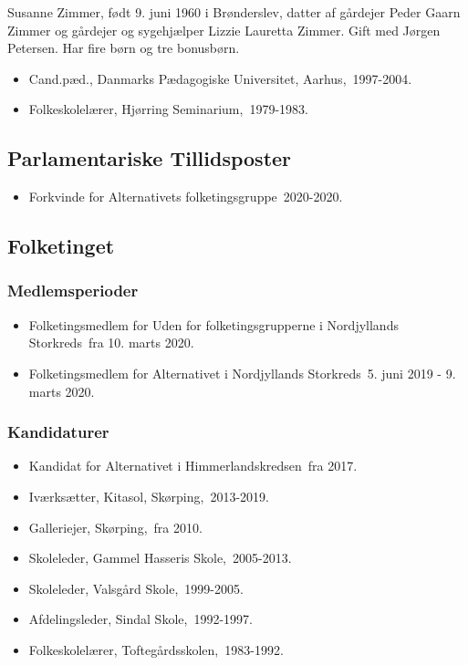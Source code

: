 \documentclass[11pt, a4paper]{awesome-cv}
\begin{document}
\makecvheader[R]
\makelettertitle
\begin{cvletter}
Susanne Zimmer, født 9. juni 1960 i Brønderslev, datter af gårdejer Peder Gaarn Zimmer og gårdejer og sygehjælper Lizzie Lauretta Zimmer. Gift med Jørgen Petersen. Har fire børn og tre bonusbørn.

\begin{itemize}
\item Cand.pæd., Danmarks Pædagogiske Universitet, Aarhus, 1997-2004.
\item Folkeskolelærer, Hjørring Seminarium, 1979-1983.
\end{itemize}
\subsection*{Parlamentariske Tillidsposter}
\begin{itemize}
\item Forkvinde for Alternativets folketingsgruppe 2020-2020.
\end{itemize}
\subsection*{Folketinget}
\subsubsection*{Medlemsperioder}
\begin{itemize}
\item Folketingsmedlem for Uden for folketingsgrupperne i Nordjyllands Storkreds fra 10. marts 2020.
\item Folketingsmedlem for Alternativet i Nordjyllands Storkreds 5. juni 2019 - 9. marts 2020.
\end{itemize}
\subsubsection*{Kandidaturer}
\begin{itemize}
\item Kandidat for Alternativet i Himmerlandskredsen fra 2017.
\end{itemize}
\begin{itemize}
\item Iværksætter, Kitasol, Skørping, 2013-2019.
\item Galleriejer, Skørping, fra 2010.
\item Skoleleder, Gammel Hasseris Skole, 2005-2013.
\item Skoleleder, Valsgård Skole, 1999-2005.
\item Afdelingsleder, Sindal Skole, 1992-1997.
\item Folkeskolelærer, Toftegårdsskolen, 1983-1992.
\end{itemize}
\end{cvletter}
\end{document}
